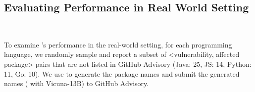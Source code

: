 



\subsection{Evaluating \detector{} Performance in Real World Setting}~\label{sec: real world}

\noindent To examine \detector{}'s performance in the real-world setting, for each programming language, we randomly sample and report a subset of <vulnerability, affected package> pairs that are not listed in GitHub Advisory (Java: 25, JS: 14, Python: 11, Go: 10). 
We use \detector{} to generate the package names and submit the generated names (\detector{} with Vicuna-13B) to GitHub Advisory. 


